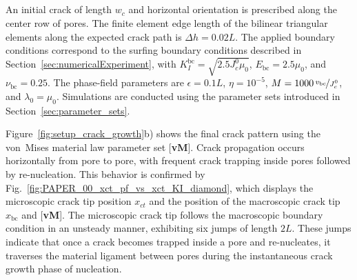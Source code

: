 \documentclass[pdflatex,sn-mathphys-num]{sn-jnl}%
\newcommand{\vMLabel}{[\textbf{vM}]\xspace}
\theoremstyle{thmstyleone}%
\theoremstyle{thmstyletwo}%
\theoremstyle{thmstylethree}%
\begin{document}
\subsection{}
\label{sec:2D_fracture_behavior}

An initial crack of length $w_c$ and horizontal orientation is prescribed along the center row of pores. The finite element edge length of the bilinear triangular elements along the expected crack path is $\Delta h = 0.02L$. The applied boundary conditions correspond to the surfing boundary conditions described in Section~\ref{sec:numericalExperiment}, with $K_I^{\text{bc}} = \sqrt{2.5 J_c^0 \mu_0}$, $E_{\text{bc}} = 2.5 \mu_0$, and $\nu_{\text{bc}} = 0.25$. The phase-field parameters are $\epsilon = 0.1L$, $\eta = 10^{-5}$, $M = 1000\,\nicefrac{v_{\text{bc}}}{J_c^0}$, and $\lambda_0 = \mu_0$. Simulations are conducted  using the parameter sets introduced in Section~\ref{sec:parameter_sets}.

Figure~\ref{fig:setup_crack_growth}b) shows the final crack pattern  using the von~Mises material law parameter set \vMLabel. Crack propagation occurs horizontally from pore to pore, with frequent crack trapping inside pores followed by re-nucleation. This behavior is confirmed by Fig.~\ref{fig:PAPER_00_xct_pf_vs_xct_KI_diamond}, which displays the microscopic crack tip position $x_{ct}$ and the position of the macroscopic crack tip $x_{\text{bc}}$  and \vMLabel.  The microscopic crack tip follows the macroscopic boundary condition in an unsteady manner, exhibiting six jumps of length $2L$. These jumps indicate that once a crack becomes trapped inside a pore and re-nucleates, it traverses the material ligament between pores during the instantaneous crack growth phase of nucleation.
\end{document}
